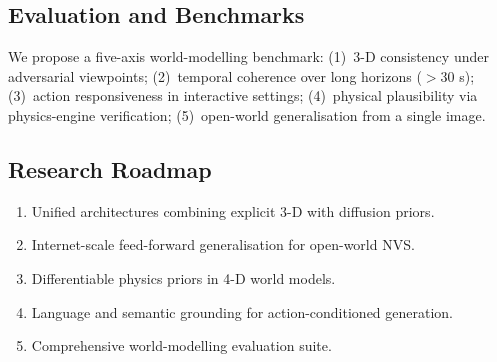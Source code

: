 \subsection{Evaluation and Benchmarks}

We propose a five-axis world-modelling benchmark:
(1)~3-D consistency under adversarial viewpoints;
(2)~temporal coherence over long horizons ($>$30 s);
(3)~action responsiveness in interactive settings;
(4)~physical plausibility via physics-engine verification;
(5)~open-world generalisation from a single image.

\subsection{Research Roadmap}

\begin{enumerate}[leftmargin=*,label=\textbf{R\arabic*.}]
  \item Unified architectures combining explicit 3-D with diffusion priors.
  \item Internet-scale feed-forward generalisation for open-world NVS.
  \item Differentiable physics priors in 4-D world models.
  \item Language and semantic grounding for action-conditioned generation.
  \item Comprehensive world-modelling evaluation suite.
\end{enumerate}

